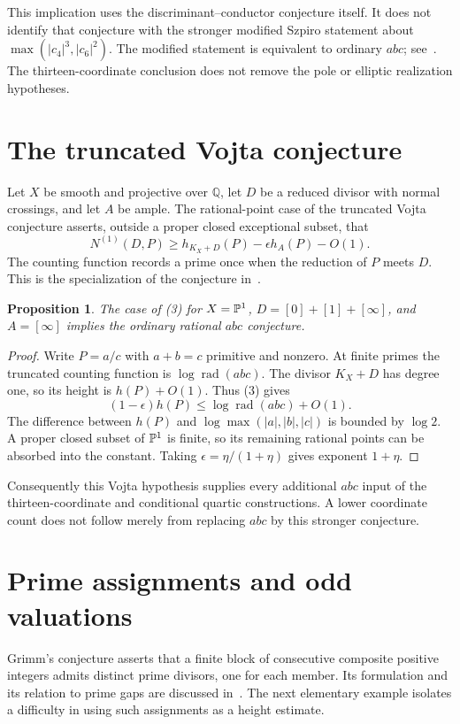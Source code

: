 \documentclass[11pt,a4paper]{article}
\newtheorem{proposition}[theorem]{Proposition}
\newcommand{\Q}{\mathbb Q}\newcommand{\Z}{\mathbb Z}
\DeclareMathOperator{\rad}{rad}
\begin{document}
This implication uses the discriminant--conductor conjecture itself.
It does not identify that conjecture with the stronger modified
Szpiro statement about $\max(|c_4|^3,|c_6|^2)$.
The modified statement is equivalent to ordinary $abc$;
see~\cite[\S I.3]{Oesterle}. The thirteen-coordinate conclusion
does not remove the pole or elliptic realization hypotheses.

\section{The truncated Vojta conjecture}

Let $X$ be smooth and projective over $\Q$, let $D$ be a
reduced divisor with normal crossings, and let $A$ be ample.
The rational-point case of the truncated Vojta conjecture
asserts, outside a proper closed exceptional subset, that
\[
 N^{(1)}(D,P)\ge h_{K_X+D}(P)-\epsilon h_A(P)-O(1).
 \tag{3}
\]
The counting function records a prime once when the reduction of
$P$ meets $D$. This is the specialization of the conjecture
in~\cite[Conjecture 2.3]{Vojta}.

\begin{proposition}
The case of (3) for
$X=\mathbb P^1$, $D=[0]+[1]+[\infty]$, and $A=[\infty]$
implies the ordinary rational $abc$ conjecture.
\end{proposition}
\begin{proof}
Write $P=a/c$ with $a+b=c$ primitive and nonzero.
At finite primes the truncated counting function is
$\log\rad(abc)$. The divisor $K_X+D$ has degree one, so
its height is $h(P)+O(1)$. Thus (3) gives
\[
 (1-\epsilon)h(P)\le\log\rad(abc)+O(1).
\]
The difference between $h(P)$ and
$\log\max(|a|,|b|,|c|)$ is bounded by $\log 2$.
A proper closed subset of $\mathbb P^1$ is finite, so its remaining
rational points can be absorbed into the constant.
Taking $\epsilon=\eta/(1+\eta)$ gives exponent $1+\eta$.
\end{proof}

Consequently this Vojta hypothesis supplies every additional
$abc$ input of the thirteen-coordinate and conditional quartic
constructions. A lower coordinate count does not follow merely
from replacing $abc$ by this stronger conjecture.

\section{Prime assignments and odd valuations}

Grimm's conjecture asserts that a finite block of consecutive
composite positive integers admits distinct prime divisors,
one for each member. Its formulation and its relation to prime
gaps are discussed in~\cite{ErdosPomerance}.
The next elementary example isolates a difficulty in using
such assignments as a height estimate.
\end{document}
